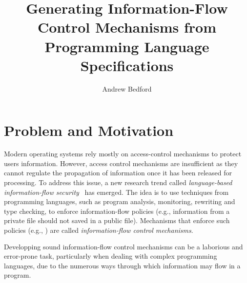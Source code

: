\documentclass[sigplan,10pt]{acmart}\settopmatter{printfolios=true,printccs=false,printacmref=false}
\begin{document}
\title[ott-ifc]{Generating Information-Flow Control Mechanisms from Programming Language Specifications}


\author{Andrew Bedford}



\maketitle

\section{Problem and Motivation}
Modern operating systems rely mostly on access-control mechanisms to protect users information. However, access control mechanisms are insufficient as they cannot regulate the propagation of information once it has been released for processing. To address this issue, a new research trend called \emph{language-based information-flow security}~\cite{DBLP:journals/jsac/SabelfeldM03} has emerged. The idea is to use techniques from programming languages, such as program analysis, monitoring, rewriting and type checking, to enforce information-flow policies (e.g., information from a private file should not saved in a public file). Mechanisms that enforce such policies (e.g., \cite{DBLP:journals/jcs/VolpanoIS96, DBLP:conf/csfw/ChudnovN10, DBLP:conf/csfw/AskarovCM15, DBLP:journals/compsec/BedfordCDKT17}) are called \emph{information-flow control mechanisms}. 

Developping sound information-flow control mechanisms can be a laborious and error-prone task, particularly when dealing with complex programming languages, due to the numerous ways through which information may flow in a program.
\end{document}
